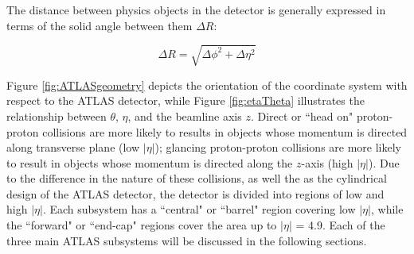 The distance between physics objects in the detector is generally expressed in terms of the solid angle between them $\Delta R$: 

\begin{equation}
	\Delta R = \sqrt{\Delta\phi^2 + \Delta\eta^2}
\end{equation}

\par

\indent Figure \ref{fig:ATLASgeometry} depicts the orientation of the coordinate system with respect to the ATLAS detector, while Figure \ref{fig:etaTheta} illustrates the relationship between $\theta$, $\eta$, and the beamline axis $z$. Direct or ``head on" proton-proton collisions are more likely to results in objects whose momentum is directed along transverse plane (low $|\eta|$); glancing proton-proton collisions are more likely to result in objects whose momentum is directed along the $z$-axis (high $|\eta|$). Due to the difference in the nature of these collisions, as well the as the cylindrical design of the ATLAS detector, the detector is divided into regions of low and high $|\eta|$. Each subsystem has a ``central" or ``barrel" region covering low $|\eta|$, while the ``forward" or ``end-cap" regions cover the area up to $|\eta|$ = 4.9. Each of the three main ATLAS subsystems will be discussed in the following sections.

